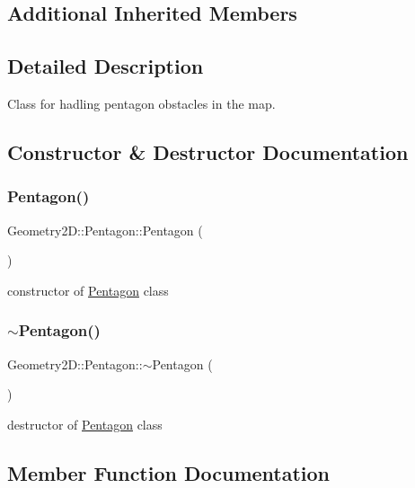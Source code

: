\subsection*{Additional Inherited Members}


\subsection{Detailed Description}
Class for hadling pentagon obstacles in the map. 

\subsection{Constructor \& Destructor Documentation}
\mbox{\label{class_geometry2_d_1_1_pentagon_ab7db58850051b5fc59c5f16428020e6b}} 
\subsubsection{\texorpdfstring{Pentagon()}{Pentagon()}}
{\footnotesize\ttfamily Geometry2\+D\+::\+Pentagon\+::\+Pentagon (\begin{DoxyParamCaption}{ }\end{DoxyParamCaption})}

constructor of \mbox{\hyperlink{class_geometry2_d_1_1_pentagon}{Pentagon}} class \mbox{\label{class_geometry2_d_1_1_pentagon_ac7b31f244f4419cc5b564a6b35d0f1fc}} 
\subsubsection{\texorpdfstring{$\sim$\+Pentagon()}{~Pentagon()}}
{\footnotesize\ttfamily Geometry2\+D\+::\+Pentagon\+::$\sim$\+Pentagon (\begin{DoxyParamCaption}{ }\end{DoxyParamCaption})}

destructor of \mbox{\hyperlink{class_geometry2_d_1_1_pentagon}{Pentagon}} class 

\subsection{Member Function Documentation}
\mbox{\label{class_geometry2_d_1_1_pentagon_a132f80b78a2bf41e393becaaae5b535e}} 
